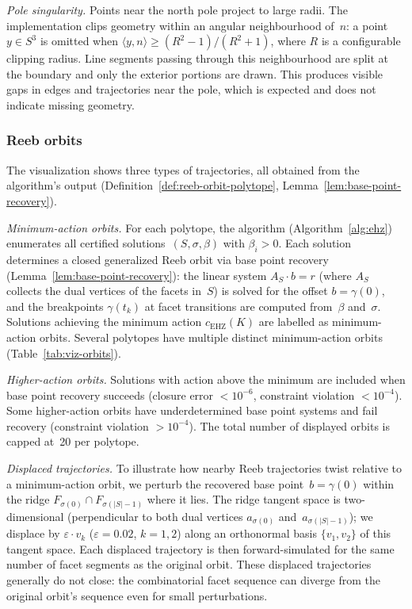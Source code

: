 \emph{Pole singularity.}
Points near the north pole project to large radii.
The implementation clips geometry within an angular neighbourhood
of~$n$: a point~$y \in S^3$ is omitted when
$\langle y, n \rangle \geq (R^2 - 1)/(R^2 + 1)$,
where $R$ is a configurable clipping radius.
Line segments passing through this neighbourhood are split at the
boundary and only the exterior portions are drawn.
This produces visible gaps in edges and trajectories near the pole,
which is expected and does not indicate missing geometry.

\subsubsection*{Reeb orbits}

The visualization shows three types of trajectories,
all obtained from the algorithm's output
(Definition~\ref{def:reeb-orbit-polytope},
Lemma~\ref{lem:base-point-recovery}).

\emph{Minimum-action orbits.}
For each polytope, the algorithm (Algorithm~\ref{alg:ehz})
enumerates all certified solutions~$(S, \sigma, \beta)$
with $\beta_i > 0$.
Each solution determines a closed generalized Reeb orbit
via base point recovery (Lemma~\ref{lem:base-point-recovery}):
the linear system $A_S \cdot b = r$ (where $A_S$ collects the
dual vertices of the facets in~$S$) is solved for
the offset $b = \gamma(0)$, and the breakpoints
$\gamma(t_k)$ at facet transitions are computed from~$\beta$
and~$\sigma$.
Solutions achieving the minimum action $c_\mathrm{EHZ}(K)$
are labelled as minimum-action orbits.
Several polytopes have multiple distinct minimum-action orbits
(Table~\ref{tab:viz-orbits}).

\emph{Higher-action orbits.}
Solutions with action above the minimum are included
when base point recovery succeeds
(closure error ${} < 10^{-6}$,
constraint violation ${} < 10^{-4}$).
Some higher-action orbits have underdetermined base point
systems and fail recovery
(constraint violation ${} > 10^{-4}$).
The total number of displayed orbits is capped at~20
per polytope.

\emph{Displaced trajectories.}
To illustrate how nearby Reeb trajectories twist relative
to a minimum-action orbit, we perturb the recovered base
point~$b = \gamma(0)$ within the ridge
$F_{\sigma(0)} \cap F_{\sigma(|S|-1)}$ where it lies.
The ridge tangent space is two-dimensional
(perpendicular to both dual vertices $a_{\sigma(0)}$
and~$a_{\sigma(|S|-1)}$); we displace by
$\varepsilon \cdot v_k$ ($\varepsilon = 0.02$, $k = 1, 2$)
along an orthonormal basis $\{v_1, v_2\}$ of this tangent space.
Each displaced trajectory is then forward-simulated for the
same number of facet segments as the original orbit.
These displaced trajectories generally do not close:
the combinatorial facet sequence can diverge from the
original orbit's sequence even for small perturbations.

